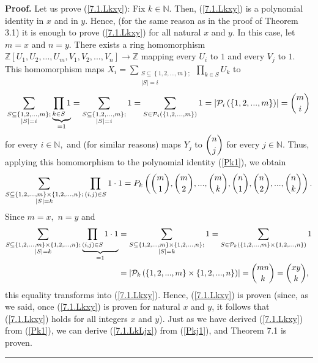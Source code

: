\documentclass[numbers=enddot,12pt,final,onecolumn,notitlepage]{scrartcl}%
\newenvironment{proof}[1][Proof]{\noindent\textbf{#1.} }{\ \rule{0.5em}{0.5em}}
\begin{document}
\begin{proof}
Let us prove (\ref{7.1.Lkxy}): Fix $k\in\mathbb{N}$. Then, (\ref{7.1.Lkxy}) is
a polynomial identity in $x$ and in $y.$ Hence, (for the same reason as in the
proof of Theorem 3.1) it is enough to prove (\ref{7.1.Lkxy}) for all natural
$x$ and $y$. In this case, let $m=x$ and $n=y$. There exists a ring
homomorphism $\mathbb{Z}\left[  U_{1},U_{2},...,U_{m},V_{1},V_{2}%
,...,V_{n}\right]  \rightarrow\mathbb{Z}$ mapping every $U_{i}$ to $1$ and
every $V_{j}$ to $1$. This homomorphism maps $X_{i}=\sum
\limits_{\substack{S\subseteq\left\{  1,2,...,m\right\}  ;\\\left\vert
S\right\vert =i}}\prod\limits_{k\in S}U_{k}$ to%
\[
\sum\limits_{\substack{S\subseteq\left\{  1,2,...,m\right\}  ;\\\left\vert
S\right\vert =i}}\underbrace{\prod\limits_{k\in S}1}_{=1}=\sum
\limits_{\substack{S\subseteq\left\{  1,2,...,m\right\}  ;\\\left\vert
S\right\vert =i}}1=\sum\limits_{S\in\mathcal{P}_{i}\left(  \left\{
1,2,...,m\right\}  \right)  }1=\left\vert \mathcal{P}_{i}\left(  \left\{
1,2,...,m\right\}  \right)  \right\vert =\dbinom{m}{i}%
\]
for every $i\in\mathbb{N},$ and (for similar reasons) maps $Y_{j}$ to
$\dbinom{n}{j}$ for every $j\in\mathbb{N}$. Thus, applying this homomorphism
to the polynomial identity (\ref{Pk1}), we obtain%
\[
\sum_{\substack{S\subseteq\left\{  1,2,...,m\right\}  \times\left\{
1,2,...,n\right\}  ;\\\left\vert S\right\vert =k}}\prod_{\left(  i,j\right)
\in S}1\cdot1=P_{k}\left(  \dbinom{m}{1},\dbinom{m}{2},...,\dbinom{m}%
{k},\dbinom{n}{1},\dbinom{n}{2},...,\dbinom{n}{k}\right)  .
\]
Since $m=x,$ $n=y$ and
\begin{align*}
\sum_{\substack{S\subseteq\left\{  1,2,...,m\right\}  \times\left\{
1,2,...,n\right\}  ;\\\left\vert S\right\vert =k}}\underbrace{\prod_{\left(
i,j\right)  \in S}1\cdot1}_{=1}  &  =\sum_{\substack{S\subseteq\left\{
1,2,...,m\right\}  \times\left\{  1,2,...,n\right\}  ;\\\left\vert
S\right\vert =k}}1=\sum_{S\in\mathcal{P}_{k}\left(  \left\{
1,2,...,m\right\}  \times\left\{  1,2,...,n\right\}  \right)  }1\\
&  =\left\vert \mathcal{P}_{k}\left(  \left\{  1,2,...,m\right\}
\times\left\{  1,2,...,n\right\}  \right)  \right\vert =\dbinom{mn}{k}%
=\dbinom{xy}{k},
\end{align*}
this equality transforms into (\ref{7.1.Lkxy}). Hence, (\ref{7.1.Lkxy}) is
proven (since, as we said, once (\ref{7.1.Lkxy}) is proven for natural $x$ and
$y$, it follows that (\ref{7.1.Lkxy}) holds for all integers $x$ and $y$).
Just as we have derived (\ref{7.1.Lkxy}) from (\ref{Pk1}), we can derive
(\ref{7.1.LkLjx}) from (\ref{Pkj1}), and Theorem 7.1 is proven.
\end{proof}
\end{document}
